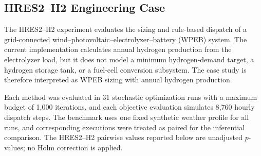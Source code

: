 \begin{table}[p]
\centering\scriptsize
\caption{Direct paired comparison between the DTW and DDTW hybrids on CEC2022 ($N=31$).}
\label{tab:cec-global-dtw-en}
\end{table}


\subsection{HRES2--H2 Engineering Case}
\label{sec:statistical-hres2-en}

The HRES2--H2 experiment evaluates the sizing and rule-based dispatch of a
grid-connected wind--photovoltaic--electrolyzer--battery (WPEB) system. The
current implementation calculates annual hydrogen production from the
electrolyzer load, but it does not model a minimum hydrogen-demand target, a
hydrogen storage tank, or a fuel-cell conversion subsystem. The case study is
therefore interpreted as WPEB sizing with annual hydrogen production.

Each method was evaluated in 31 stochastic optimization runs with a maximum budget of 1,000 iterations, and each objective evaluation simulates 8,760 hourly dispatch steps. The benchmark uses one fixed synthetic weather profile for all runs, and corresponding executions were treated as paired for the inferential comparison. The HRES2--H2 pairwise values reported below are unadjusted $p$-values; no Holm correction is applied.

